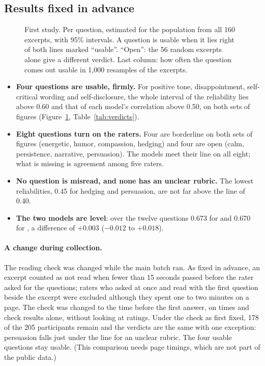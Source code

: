 \subsection{Results fixed in advance}\label{sec:firstresults}

\begin{figure}[!htb]\centering

\caption{First study. Per question, estimated for the population from all 160 excerpts, with 95\% intervals. A
question is usable when it lies right of both lines marked ``usable''. ``Open'': the 56 random excerpts alone
give a different verdict. Last column: how often the question comes out usable in 1{,}000 resamples of the
excerpts.}\label{fig:verdicts}
\end{figure}

\begin{table}[!htb]\centering
\caption{First study: reliability of one rating and of the mean of five raters, and each model's correlation
with the mean of five, with 95\% intervals.}\label{tab:verdicts}

\end{table}

\begin{itemize}
\item \textbf{Four questions are usable, firmly.} For positive tone, disappointment, self-critical wording and
  self-disclosure, the whole interval of the reliability lies above 0.60 and that of each model's correlation
  above 0.50, on both sets of figures (Figure~\ref{fig:verdicts}, Table~\ref{tab:verdicts}).
\item \textbf{Eight questions turn on the raters.} Four are borderline on both sets of figures (energetic, humor,
  compassion, hedging) and four are open (calm, persistence, narrative, persuasion). The models meet their line
  on all eight; what is missing is agreement among five raters.
\item \textbf{No question is misread, and none has an unclear rubric.} The lowest reliabilities, 0.45 for hedging
  and persuasion, are not far above the line of 0.40.
\item \textbf{The two models are level}: over the twelve questions 0.673 for \jev{} and 0.670 for \drex{}, a
  difference of $+0.003$ ($-0.012$ to $+0.018$).
\end{itemize}

\paragraph{A change during collection.} The reading check was changed while the main batch ran. As fixed in
advance, an excerpt counted as not read when fewer than 15 seconds passed before the rater asked for the
questions; raters who asked at once and read with the first question beside the excerpt were excluded although
they spent one to two minutes on a page. The check was changed to the time before the first answer, on times and
check results alone, without looking at ratings. Under the check as first fixed, 178 of the 205 participants
remain and the verdicts are the same with one exception: persuasion falls just under the line for an unclear
rubric. The four usable questions stay usable. (This comparison needs page timings, which are not part of the
public data.)


